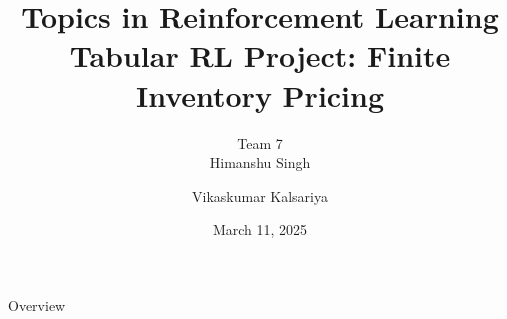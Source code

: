 \documentclass[9pt]{slides}
\title{{\normalsize Topics in Reinforcement Learning} \\ \vspace{0.5em} Tabular RL Project: Finite Inventory Pricing}
\author{Team 7 \\ \vspace{0.5em} Himanshu Singh \and Vikaskumar Kalsariya}
\date{March 11, 2025}
\begin{document}
\begin{frame}
    \titlepage
\end{frame}

\begin{frame}{Overview}
    \tableofcontents
\end{frame}




\end{document}
